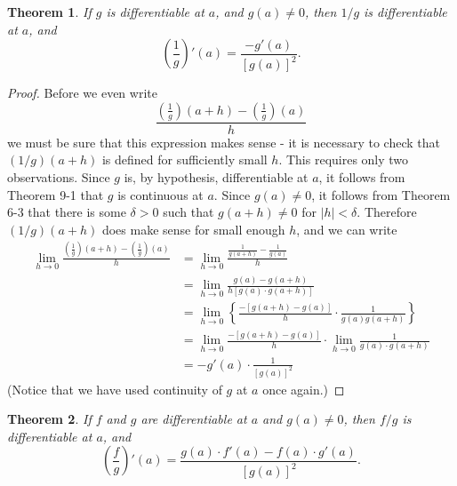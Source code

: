 \documentclass{article}
\newtheorem{theorem}{Theorem}
\begin{document}
\begin{theorem}
  If $g$ is differentiable at $a$, and $g(a) \neq 0$, then $1/g$ is
  differentiable at $a$, and \[
    \left(\frac{1}{g}\right)'(a) = \frac{-g'(a)}{[g(a)]^2}.
  \]
\end{theorem}
\begin{proof}
  Before we even write \[
    \frac{\left(\frac{1}{g}\right)(a + h) - \left(\frac{1}{g}\right)(a)}{h}
  \] we must be sure that this expression makes sense - it is necessary to
  check that $(1/g)(a + h)$ is defined for sufficiently small $h$. This
  requires only two observations. Since $g$ is, by hypothesis, differentiable
  at $a$, it follows from Theorem 9-1 that $g$ is continuous at $a$. Since
  $g(a) \neq 0$, it follows from Theorem 6-3 that there is some $\delta > 0$
  such that $g(a + h) \neq 0$ for $|h| < \delta$. Therefore $(1/g)(a + h)$ does
  make sense for small enough $h$, and we can write
  \begin{align*}
    \lim_{h \to 0} \frac{\left( \frac{1}{g} \right)(a + h) - \left( \frac
    {1}{g} \right)(a)}{h}
    &= \lim_{h \to 0} \frac{\frac{1}{g(a + h)} - \frac{1}{g(a)}}{h} \\
    &= \lim_{h \to 0} \frac{g(a) - g(a + h)}{h[g(a) \cdot g(a + h)]} \\
    &= \lim_{h \to 0} \left\{ \frac{-[g(a + h) - g(a)]}{h} \cdot \frac{1}
    {g(a)g(a + h)} \right\} \\
    &= \lim_{h \to 0} \frac{-[g(a + h) - g(a)]}{h} \cdot \lim_{h \to 0}
    \frac{1}{g(a) \cdot g(a + h)} \\
    &= -g'(a) \cdot \frac{1}{[g(a)]^2}
  \end{align*}
  (Notice that we have used continuity of $g$ at $a$ once again.)
\end{proof}

\begin{theorem}
  If $f$ and $g$ are differentiable at $a$ and $g(a) \neq 0$, then $f/g$ is
  differentiable at $a$, and \[
    \left( \frac{f}{g} \right)'(a)
    = \frac{g(a) \cdot f'(a) - f(a) \cdot g'(a)}{[g(a)]^2}.
  \]
\end{theorem}
\end{document}

